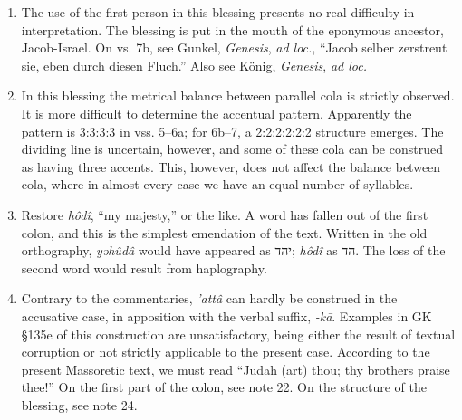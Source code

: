 \begin{enumerate}
Zimmern, ``Der Jakobssegen und der Tierkreis,'' \emph{ZA} VII (1892),
pp. 161--172, finds in this verse a mythological borrowing from the Babylonian
Gilgamesh. Gilgamesh and Enkidu are recorded as slaying a giant named Huwawa =
Humbaba, the guardian of the cedar forests; and in another episode, as together
killing the Bull of heaven. Following this, Ishtar pronounces a curse on
Gilgamesh, and Enkidu is slain by the gods. Certainly no direct connection
between the Babylonian myth and the Israelite poem exists. If there is any
relationship at all, it is a remote one, and lies in the use of poetic language
in the blessing which may ultimately rest upon an allusion to the heroic
exploits of the Babylonian brothers-in-arms. To the composer of the blessing,
the expression was a striking description of a pair of violent men. That is all
it means in this context. It may possibly, however, have come down to him as a
brief summary of the activities of those typical men of violence, Gilgamesh
and Enkidu. See also E. Burrows, \emph{The Oracles of Jacob and Balaam},
London, 1939; his conclusions are utterly fantastic, however. Cf. note 26.

\item
The use of the first person in this blessing presents no real difficulty in
interpretation. The blessing is put in the mouth of the eponymous ancestor,
Jacob-Israel. On vs. 7b, see Gunkel, \emph{Genesis}, \emph{ad loc.},
``Jacob selber zerstreut sie, eben durch diesen Fluch.'' Also see König,
\emph{Genesis}, \emph{ad loc.}

\item
In this blessing the metrical balance between parallel cola is strictly
observed. It is more difficult to determine the accentual pattern. Apparently
the pattern is 3:3:3:3 in vss. 5--6a; for 6b--7, a 2:2:2:2:2:2 structure
emerges. The dividing line is uncertain, however, and some of these cola can
be construed as having three accents. This, however, does not affect the
balance between cola, where in almost every case we have an equal number of
syllables.

\item
Restore \emph{hôdî}, ``my majesty,'' or the like. A word has fallen out of the
first colon, and this is the simplest emendation of the text. Written in the
old orthography, \emph{yəhûdâ} would have appeared as יהד; \emph{hôdî} as הד.
The loss of the second word would result from haplography.

\item
Contrary to the commentaries, \emph{'attâ} can hardly be construed in the
accusative case, in apposition with the verbal suffix, \emph{-kā}. Examples in
GK §135e of this construction are unsatisfactory, being either the result of
textual corruption or not strictly applicable to the present case. According
to the present Massoretic text, we must read ``Judah (art) thou; thy brothers
praise thee!'' On the first part of the colon, see note 22. On the structure
of the blessing, see note 24.


\end{enumerate}
